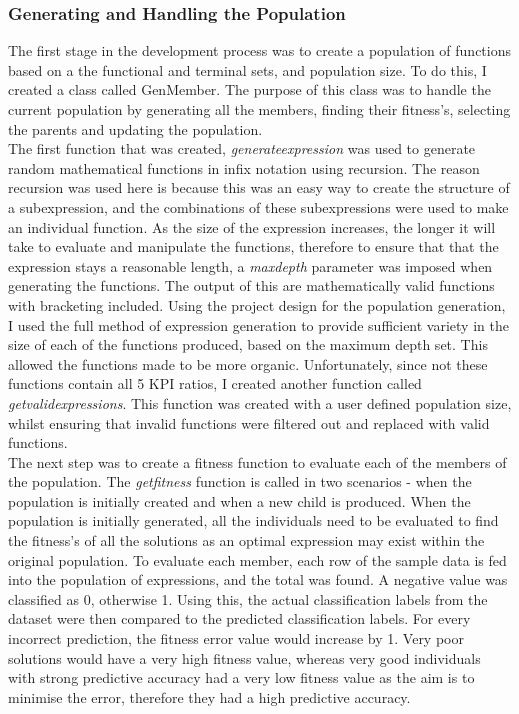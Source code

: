 \documentclass[11pt]{article}
\begin{document}
 \subsubsection{Generating and Handling the Population}
The first stage in the development process was to create a population of functions based on a the functional and terminal sets, and population size. To do this, I created a class called GenMember.
 The purpose of this class was to handle the current population by generating all the members, finding their fitness's, selecting the parents and updating the population.\\
The first function that was created, \textit{generate\textunderscore expression }was used to generate random mathematical functions in infix notation using recursion. 
The reason recursion was used here is because this was an easy way to create the structure of a subexpression, and the combinations of these subexpressions were used to make an individual function.  
As the size of the expression increases, the longer it will take to evaluate and manipulate the functions,  therefore to ensure that that the expression stays a reasonable length, a \textit{max\textunderscore depth} parameter was imposed when generating the functions.
The output of this are mathematically valid functions with bracketing included. 
Using the project design for the population generation, I used the full method of expression generation to provide sufficient variety in the size of each of the functions produced, based on the maximum depth set. This allowed the functions made to be more organic. 
Unfortunately, since not these functions contain all 5 KPI ratios, I created another function called \textit{get\textunderscore valid\textunderscore expressions}. This function was created with a user defined population size, whilst ensuring that invalid functions were filtered out and replaced with valid functions. 
 \\
The next step was to create a fitness function to evaluate each of the members of the population.
The \textit{get\textunderscore fitness} function is called in two scenarios - when the population is initially created and when a new child is produced. When the population is initially generated, all the individuals need to be evaluated to find the fitness's of all the solutions as an optimal expression may exist within the original population. To evaluate each member, each row of the sample data is fed into the population of expressions, and the total was found. A negative value was classified as 0, otherwise 1. Using this, the actual classification labels from the dataset were then compared to the predicted classification labels. For every incorrect prediction, the fitness error value would increase by 1. Very poor solutions would have a very high fitness value, whereas very good individuals with strong predictive accuracy had a very low fitness value as the aim is to minimise the error, therefore they had a high predictive accuracy.\\
\end{document}
